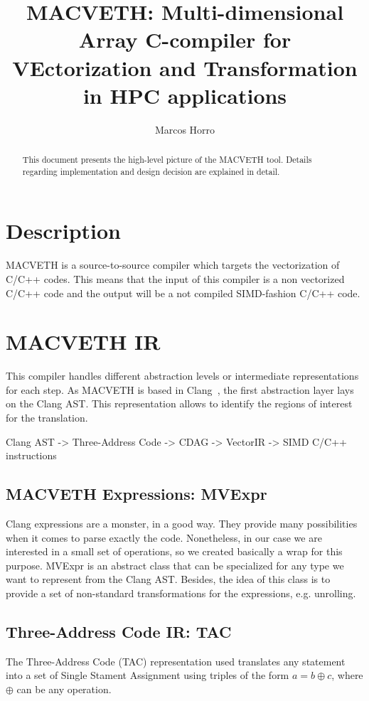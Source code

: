 \documentclass[a4paper,12pt]{memoir}
\title{\textbf{MACVETH}: \textbf{M}ulti-dimensional \textbf{A}rray
    \textbf{C}-compiler for \textbf{VE}ctorization and
    \textbf{T}ransformation in \textbf{H}PC applications}
\author{Marcos Horro}
\date{}
\begin{document}
\maketitle

\begin{abstract}
    This document presents the high-level picture of the MACVETH tool. Details regarding implementation and design decision are explained in detail.
\end{abstract}

\chapter*{Description}
MACVETH is a source-to-source compiler which targets the vectorization of C/C++
codes. This means that the input of this compiler is a non vectorized C/C++ code
and the output will be a not compiled SIMD-fashion C/C++ code.

\chapter*{MACVETH IR}
This compiler handles different abstraction levels or intermediate
representations for each step. As MACVETH is based in Clang~\cite{bib:clang},
the first abstraction layer lays on the Clang AST. This representation allows to
identify the regions of interest for the translation.

Clang AST -> Three-Address Code -> CDAG -> VectorIR -> SIMD C/C++ instructions

\section{MACVETH Expressions: MVExpr}
Clang expressions are a monster, in a good way. They provide many possibilities
when it comes to parse exactly the code. Nonetheless, in our case we are
interested in a small set of operations, so we created basically a wrap for this
purpose. MVExpr is an abstract class that can be specialized for any type we
want to represent from the Clang AST. Besides, the idea of this class is to
provide a set of non-standard transformations for the expressions, e.g.
unrolling.

\section{Three-Address Code IR: TAC}
The Three-Address Code (TAC) representation used translates any statement into a
set of Single Stament Assignment using triples of the form $a = b \oplus c$,
where $\oplus$ can be any operation.
\end{document}
